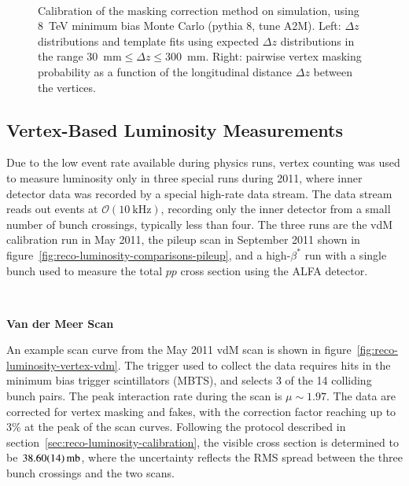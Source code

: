 \begin{figure}[p]
{	}
	\\
	\caption{Calibration of the masking correction method on simulation, using 8~TeV minimum bias Monte Carlo (pythia 8, tune A2M). Left: $\Delta z$ distributions and template fits using expected $\Delta z$ distributions in the range $30$~mm$\leq\Delta z\leq300$~mm. Right: pairwise vertex masking probability as a function of the longitudinal distance $\Delta z$ between the vertices.}
	\label{fig:masking-correction-mc}
\end{figure}

\subsection{Vertex-Based Luminosity Measurements}
Due to the low event rate available during physics runs, vertex counting was used to measure luminosity only in three special runs during 2011, where inner detector data was recorded by a special high-rate data stream. The data stream reads out events at $\mathcal{O}(\SI{10}{\kilo\hertz})$, recording only the inner detector from a small number of bunch crossings, typically less than four. The three runs are the vdM calibration run in May 2011, the pileup scan in September 2011 shown in figure~\ref{fig:reco-luminosity-comparisons-pileup}, and a high-$\beta^{*}$ run with a single bunch used to measure the total $pp$ cross section using the ALFA detector. 

\ 

\textbf{Van der Meer Scan}

An example scan curve from the May 2011 vdM scan is shown in figure~\ref{fig:reco-luminosity-vertex-vdm}. The trigger used to collect the data requires hits in the minimum bias trigger scintillators (MBTS), and selects 3 of the 14 colliding bunch pairs. The peak interaction rate during the scan is $\mu\sim1.97$. The data are corrected for vertex masking and fakes, with the correction factor reaching up to 3\% at the peak of the scan curves. Following the protocol described in section~\ref{sec:reco-luminosity-calibration}, the visible cross section is determined to be $\SI{38.6\pm 0.14}{\milli\barn}$, where the uncertainty reflects the RMS spread between the three bunch crossings and the two scans.

